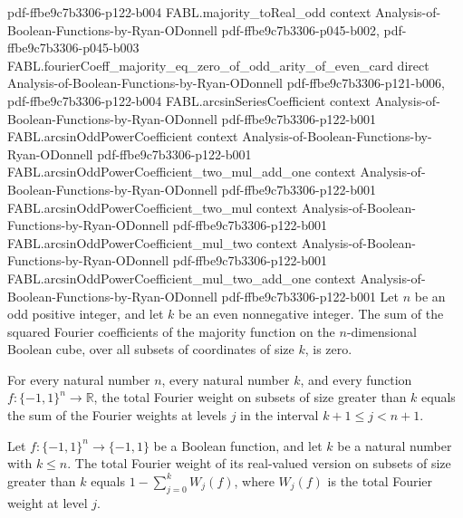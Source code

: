 \begin{theorem}
{    pdf-ffbe9c7b3306-p122-b004}
\proofstep
  {FABL.majority_toReal_odd}
  {context}
  {Analysis-of-Boolean-Functions-by-Ryan-ODonnell}
  {pdf-ffbe9c7b3306-p045-b002,
    pdf-ffbe9c7b3306-p045-b003}
\proofstep
  {FABL.fourierCoeff_majority_eq_zero_of_odd_arity_of_even_card}
  {direct}
  {Analysis-of-Boolean-Functions-by-Ryan-ODonnell}
  {pdf-ffbe9c7b3306-p121-b006,
    pdf-ffbe9c7b3306-p122-b004}
\proofstep
  {FABL.arcsinSeriesCoefficient}
  {context}
  {Analysis-of-Boolean-Functions-by-Ryan-ODonnell}
  {pdf-ffbe9c7b3306-p122-b001}
\proofstep
  {FABL.arcsinOddPowerCoefficient}
  {context}
  {Analysis-of-Boolean-Functions-by-Ryan-ODonnell}
  {pdf-ffbe9c7b3306-p122-b001}
\proofstep
  {FABL.arcsinOddPowerCoefficient_two_mul_add_one}
  {context}
  {Analysis-of-Boolean-Functions-by-Ryan-ODonnell}
  {pdf-ffbe9c7b3306-p122-b001}
\proofstep
  {FABL.arcsinOddPowerCoefficient_two_mul}
  {context}
  {Analysis-of-Boolean-Functions-by-Ryan-ODonnell}
  {pdf-ffbe9c7b3306-p122-b001}
\proofstep
  {FABL.arcsinOddPowerCoefficient_mul_two}
  {context}
  {Analysis-of-Boolean-Functions-by-Ryan-ODonnell}
  {pdf-ffbe9c7b3306-p122-b001}
\proofstep
  {FABL.arcsinOddPowerCoefficient_mul_two_add_one}
  {context}
  {Analysis-of-Boolean-Functions-by-Ryan-ODonnell}
  {pdf-ffbe9c7b3306-p122-b001}
Let $n$ be an odd positive integer, and let $k$ be an even nonnegative integer. The sum
of the squared Fourier coefficients of the majority function on the $n$-dimensional
Boolean cube, over all subsets of coordinates of size $k$, is zero.
\end{theorem}

\begin{theorem}
\label{FABL.fourierWeightAbove_eq_sum_levels}
\leanok
{}
For every natural number $n$, every natural number $k$, and every function
$f:\{-1,1\}^n\to\mathbb R$, the total Fourier weight on subsets of size greater than $k$
equals the sum of the Fourier weights at levels $j$ in the interval $k+1\le j<n+1$.
\end{theorem}

\begin{theorem}
\label{FABL.fourierWeightAbove_boolean_eq_one_sub_sum_range}
\leanok
{}
Let $f:\{-1,1\}^n\to\{-1,1\}$ be a Boolean function, and let $k$ be a natural number
with $k\le n$. The total Fourier weight of its real-valued version on subsets of size
greater than $k$ equals $1-\sum_{j=0}^{k} W_j(f)$, where $W_j(f)$ is the total Fourier
weight at level $j$.
\end{theorem}

